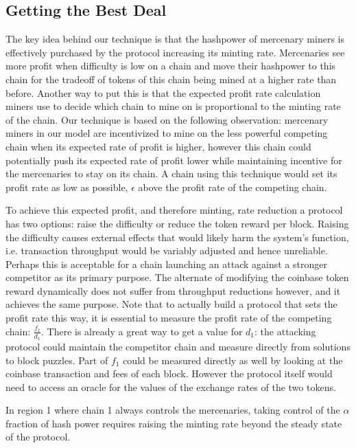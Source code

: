 \documentclass[10pt, preprint]{aastex}
\begin{document}
\subsection{Getting the Best Deal}
The key idea behind our technique is that the hashpower of mercenary miners is effectively purchased by the protocol increasing its minting rate.  Mercenaries see more profit when difficulty is low on a chain and move their hashpower to this chain for the tradeoff of tokens of this chain being mined at a higher rate than before.  Another way to put this is that the expected profit rate calculation miners use to decide which chain to mine on is proportional to the minting rate of the chain.  Our technique is based on the following observation: mercenary miners in our model are incentivized to mine on the less powerful competing chain when its expected rate of profit is higher, however this chain could potentially push its expected rate of profit lower while maintaining incentive for the mercenaries to stay on its chain.  A chain using this technique would set its profit rate as low as possible, $\epsilon$ above the profit rate of the competing chain. 

To achieve this expected profit, and therefore minting, rate reduction a protocol has two options: raise the difficulty or reduce the token reward per block.  Raising the difficulty causes external effects that would likely harm the system's function, i.e. transaction throughput would be variably adjusted and hence unreliable.  Perhaps this is acceptable for a chain launching an attack against a stronger competitor as its primary purpose.  The alternate of modifying the coinbase token reward dynamically does not suffer from throughput reductions however, and it achieves the same purpose.  Note that to actually build a protocol that sets the profit rate this way, it is essential to measure the profit rate of the competing chain: $\frac{f_1}{d_1}$.  There is already a great way to get a value for $d_1$: the attacking protocol could maintain the competitor chain and measure directly from solutions to block puzzles.  Part of $f_1$ could be measured directly as well by looking at the coinbase transaction and fees of each block.  However the protocol itself would need to access an oracle for the values of the exchange rates of the two tokens.

In region 1 where chain 1 always controls the mercenaries, taking control of the $\alpha$ fraction of hash power requires raising the minting rate beyond the steady state of the protocol.
\end{document}
